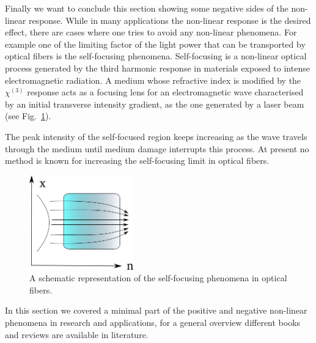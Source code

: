 Finally we want to conclude this section showing some negative sides of the non-linear response. While in many applications the non-linear response is the desired effect, there are cases where one tries to avoid any non-linear phenomena. 
For example one of the limiting factor of the light power that can be transported by optical fibers is the self-focusing phenomena. Self-focusing is a non-linear optical process generated by the third harmonic response in materials exposed to intense electromagnetic radiation. 
A medium whose refractive index is modified by the $\chi^{(3)}$ response acts as a focusing lens for an electromagnetic wave characterised by an initial transverse intensity gradient, as the one generated by a laser beam (see Fig.~\ref{selffocusing}). 


The peak intensity of the self-focused region keeps increasing as the wave travels through the medium until medium damage interrupts this process. At present no method is known for increasing the self-focusing limit in optical fibers\cite{encylaser}.\\
\begin{figure}
 \vspace{-0.8cm}
\begin{center}
\includegraphics[width=0.4\textwidth]{Figures/selffocus}
\end{center}
\vspace{-0.5cm}
\caption{A schematic representation of the self-focusing phenomena in optical fibers. \label{selffocusing}}
\end{figure}           
In this section we covered a minimal part of the positive and negative non-linear phenomena in research and applications, for a general overview different books and reviews are available in literature.\cite{boyd,bloembergen1982nonlinear}

